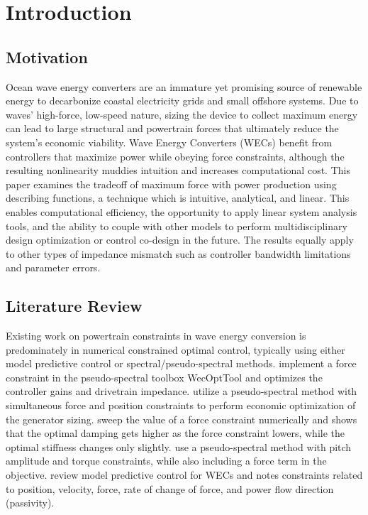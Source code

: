 \documentclass{ifacconf}
\begin{document}
\section{Introduction}
\subsection{Motivation}
Ocean wave energy converters are an immature yet promising source of renewable energy to decarbonize coastal electricity grids and small offshore systems. Due to waves' high-force, low-speed nature, sizing the device to collect maximum energy can lead to large structural and powertrain forces that ultimately reduce the system's economic viability. Wave Energy Converters (WECs) benefit from controllers that maximize power while obeying force constraints, although the resulting nonlinearity muddies intuition and increases computational cost. This paper examines the tradeoff of maximum force with power production using describing functions, a technique which is intuitive, analytical, and linear. This enables computational efficiency, the opportunity to apply linear system analysis tools, and the ability to couple with other models to perform multidisciplinary design optimization or control co-design in the future. The results equally apply to other types of impedance mismatch such as controller bandwidth limitations and parameter errors.

\subsection{Literature Review}
Existing work on powertrain constraints in wave energy conversion is predominately in numerical constrained optimal control, typically using either model predictive control or spectral/pseudo-spectral methods.  \cite{strofer_control_2023} implement a force constraint in the pseudo-spectral toolbox WecOptTool and optimizes the controller gains and drivetrain impedance. \cite{pena-sanchez_control_2022} utilize a pseudo-spectral method with simultaneous force and position constraints to perform economic optimization of the generator sizing.  \cite{sichani_constrained_2014} sweep the value of a force constraint numerically and shows that the optimal damping gets higher as the force constraint lowers, while the optimal stiffness changes only slightly. \cite{tom_pseudo-spectral_2017} use a pseudo-spectral method with pitch amplitude and torque constraints, while also including a force term in the objective. \cite{faedo_optimal_2017} review model predictive control for WECs and notes constraints related to position, velocity, force, rate of change of force, and power flow direction (passivity).
\end{document}
